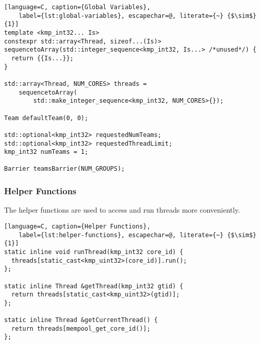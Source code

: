 \begin{lstlisting}[language=C, caption={Global Variables},
	label={lst:global-variables}, escapechar=@, literate={~} {$\sim$}{1}]
template <kmp_int32... Is>
constexpr std::array<Thread, sizeof...(Is)>
sequencetoArray(std::integer_sequence<kmp_int32, Is...> /*unused*/) {
  return {{Is...}};
}

std::array<Thread, NUM_CORES> threads =
    sequencetoArray(
        std::make_integer_sequence<kmp_int32, NUM_CORES>{});

Team defaultTeam(0, 0);

std::optional<kmp_int32> requestedNumTeams;
std::optional<kmp_int32> requestedThreadLimit;
kmp_int32 numTeams = 1;

Barrier teamsBarrier(NUM_GROUPS);
\end{lstlisting}

\subsubsection{Helper Functions}

The helper functions are used to access and run threads more conveniently.

\begin{lstlisting}[language=C, caption={Helper Functions},
	label={lst:helper-functions}, escapechar=@, literate={~} {$\sim$}{1}]
static inline void runThread(kmp_int32 core_id) {
  threads[static_cast<kmp_uint32>(core_id)].run();
};

static inline Thread &getThread(kmp_int32 gtid) {
  return threads[static_cast<kmp_uint32>(gtid)];
};

static inline Thread &getCurrentThread() {
  return threads[mempool_get_core_id()];
};
\end{lstlisting}
